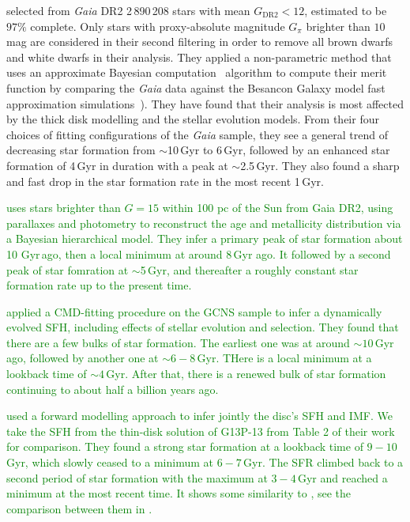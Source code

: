 \documentclass[fleqn,usenatbib]{mnras}
\begin{document}
\citet{2019A&A...624L...1M} selected from \textit{Gaia} DR2 2\,890\,208 stars
with mean $G_{\mathrm{DR2}}<12$, estimated to be $97\%$ complete. Only stars
with proxy-absolute magnitude $G_{\pi}$ brighter than $10$\,mag are considered in
their second filtering in order to remove all brown dwarfs and white dwarfs in
their analysis. They applied a non-parametric method that uses an approximate
Bayesian computation~\citep{2017A&C....19...16J} algorithm to compute their
merit function by comparing the \textit{Gaia} data against the Besancon Galaxy model
fast approximation simulations~\citep{2018A&A...620A..79M}). They have found
that their analysis is most affected by the thick disk modelling and the
stellar evolution models. From their four choices of fitting configurations of
the \textit{Gaia} sample, they see a general trend of decreasing star formation from
$\sim$10\,Gyr to 6\,Gyr, followed by an enhanced star formation of 4\,Gyr in
duration with a peak at $\sim$2.5\,Gyr. They also found a sharp and fast drop
in the star formation rate in the most recent 1\,Gyr.

\textcolor{green}{\citet{2021MNRAS.501..302A} uses stars brighter than $G = 15$
within 100 pc of the Sun from Gaia DR2, using parallaxes and photometry to
reconstruct the age and metallicity distribution via a Bayesian hierarchical model. 
They infer a primary peak of star formation about 10 Gyr\,ago, then a local
minimum at around 8\,Gyr ago. It followed by a second peak of star fomration
at $\sim$5\,Gyr, and thereafter a roughly constant star formation rate up to
the present time.
}

\textcolor{green}{\citet{2024A&A...687A.168G} applied a CMD-fitting procedure on
the GCNS sample to infer a dynamically evolved SFH, including effects of stellar
evolution and selection. They found that there are a few bulks of star formation.
The earliest one was at around $\sim$$10$\,Gyr ago, followed by another one
at $\sim$$6-8$\,Gyr. THere is a local minimum at a lookback time of $\sim$$4$\,Gyr.
After that, there is a renewed bulk of star formation continuing to about half
a billion years ago.
}


\textcolor{green}{\citet{2025A&A...697A.128D} used a forward modelling approach
to infer jointly the disc’s SFH and IMF. We take the SFH from the thin-disk
solution of G13P-13 from Table 2 of their work for comparison. They found a
strong star formation at a lookback time of $9-10$\,Gyr, which slowly ceased to
a minimum at $6-7$\,Gyr. The SFR climbed back to a second period of star
formation with the maximum at $3-4$\,Gyr and reached a minimum at the most
recent time. It shows some similarity to \citep{2019A&A...624L...1M}, see the
comparison between them in \citep{2025A&A...697A.128D}.
}
\end{document}
